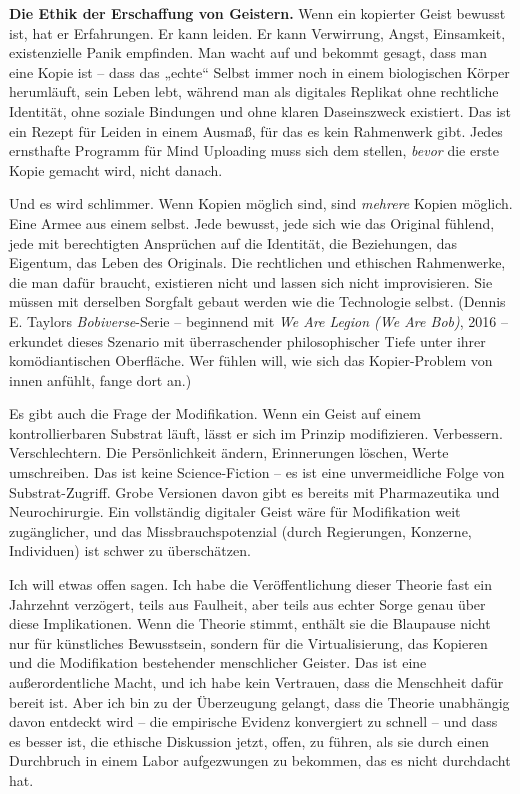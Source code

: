\documentclass[11pt, twoside, openright]{book}
\begin{document}
\textbf{Die Ethik der Erschaffung von Geistern.} Wenn ein kopierter Geist bewusst ist, hat er Erfahrungen. Er kann leiden. Er kann Verwirrung, Angst, Einsamkeit, existenzielle Panik empfinden. Man wacht auf und bekommt gesagt, dass man eine Kopie ist -- dass das „echte“ Selbst immer noch in einem biologischen Körper herumläuft, sein Leben lebt, während man als digitales Replikat ohne rechtliche Identität, ohne soziale Bindungen und ohne klaren Daseinszweck existiert. Das ist ein Rezept für Leiden in einem Ausmaß, für das es kein Rahmenwerk gibt. Jedes ernsthafte Programm für Mind Uploading muss sich dem stellen, \textit{bevor} die erste Kopie gemacht wird, nicht danach.

Und es wird schlimmer. Wenn Kopien möglich sind, sind \textit{mehrere} Kopien möglich. Eine Armee aus einem selbst. Jede bewusst, jede sich wie das Original fühlend, jede mit berechtigten Ansprüchen auf die Identität, die Beziehungen, das Eigentum, das Leben des Originals. Die rechtlichen und ethischen Rahmenwerke, die man dafür braucht, existieren nicht und lassen sich nicht improvisieren. Sie müssen mit derselben Sorgfalt gebaut werden wie die Technologie selbst. (Dennis E. Taylors \textit{Bobiverse}-Serie -- beginnend mit \textit{We Are Legion (We Are Bob)}, 2016 -- erkundet dieses Szenario mit überraschender philosophischer Tiefe unter ihrer komödiantischen Oberfläche. Wer fühlen will, wie sich das Kopier-Problem von innen anfühlt, fange dort an.)

Es gibt auch die Frage der Modifikation. Wenn ein Geist auf einem kontrollierbaren Substrat läuft, lässt er sich im Prinzip modifizieren. Verbessern. Verschlechtern. Die Persönlichkeit ändern, Erinnerungen löschen, Werte umschreiben. Das ist keine Science-Fiction -- es ist eine unvermeidliche Folge von Substrat-Zugriff. Grobe Versionen davon gibt es bereits mit Pharmazeutika und Neurochirurgie. Ein vollständig digitaler Geist wäre für Modifikation weit zugänglicher, und das Missbrauchspotenzial (durch Regierungen, Konzerne, Individuen) ist schwer zu überschätzen.

Ich will etwas offen sagen. Ich habe die Veröffentlichung dieser Theorie fast ein Jahrzehnt verzögert, teils aus Faulheit, aber teils aus echter Sorge genau über diese Implikationen. Wenn die Theorie stimmt, enthält sie die Blaupause nicht nur für künstliches Bewusstsein, sondern für die Virtualisierung, das Kopieren und die Modifikation bestehender menschlicher Geister. Das ist eine außerordentliche Macht, und ich habe kein Vertrauen, dass die Menschheit dafür bereit ist. Aber ich bin zu der Überzeugung gelangt, dass die Theorie unabhängig davon entdeckt wird -- die empirische Evidenz konvergiert zu schnell -- und dass es besser ist, die ethische Diskussion jetzt, offen, zu führen, als sie durch einen Durchbruch in einem Labor aufgezwungen zu bekommen, das es nicht durchdacht hat.
\end{document}
